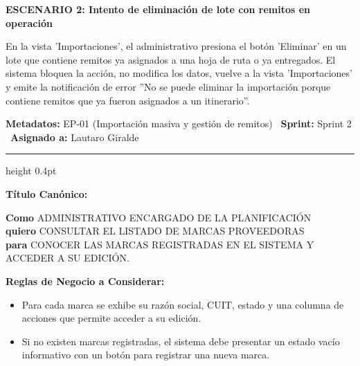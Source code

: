 \documentclass[a4paper,9pt]{article}
\begin{document}
\begin{tcolorbox}[hucard, title={\textbf{HU-40: ELIMINAR UNA IMPORTACIÓN} \hfill \scriptsize \colorbox{tealstatus}{\textbf{\ Accepted\ }} \quad \colorbox{white}{\textcolor{primarydark}{\textbf{\ 5 pts\ }}}}]
{\noindent\textbf{\textcolor{secondarydark}{ESCENARIO 2:  Intento de eliminación de lote con remitos en operación}}\par\vspace{1pt}
En la vista 'Importaciones', el administrativo presiona el botón 'Eliminar' en un lote que contiene remitos ya asignados a una hoja de ruta o ya entregados. El sistema bloquea la acción, no modifica los datos, vuelve a la vista 'Importaciones' y emite la notificación de error ''No se puede eliminar la importación porque contiene remitos que ya fueron asignados a un itinerario''.\par\vspace{2.5pt}
}\par
\end{tcolorbox}

\begin{tcolorbox}[hucard, title={\textbf{HU-239: LISTAR MARCAS} \hfill \scriptsize \colorbox{slatestatus}{\textbf{\ Done\ }} \quad \colorbox{white}{\textcolor{primarydark}{\textbf{\ 2 pts\ }}}}]
\vspace{-1pt}
\noindent\textbf{\footnotesize Metadatos:} EP-01 (Importación masiva y gestión de remitos) \textbar\ \textbf{Sprint:} Sprint 2 \textbar\ \textbf{Asignado a:} Lautaro Giralde\par\vspace{2pt}
\hrule height 0.4pt\par\vspace{3pt}
\noindent\textbf{\footnotesize Título Canónico:}\par\vspace{1pt}
{\small \textbf{Como} ADMINISTRATIVO ENCARGADO DE LA PLANIFICACIÓN \\ \textbf{quiero} CONSULTAR EL LISTADO DE MARCAS PROVEEDORAS \\ \textbf{para} CONOCER LAS MARCAS REGISTRADAS EN EL SISTEMA Y ACCEDER A SU EDICIÓN.}\par\vspace{3pt}
\noindent\textbf{\footnotesize Reglas de Negocio a Considerar:}\par\vspace{1pt}
{\footnotesize
\begin{itemize}[leftmargin=12pt, nosep, itemsep=1.5pt, topsep=1pt]
\item Para cada marca se exhibe su razón social, CUIT, estado y una columna de acciones que permite acceder a su edición.
\item Si no existen marcas registradas, el sistema debe presentar un estado vacío informativo con un botón para registrar una nueva marca.

\end{itemize}}
\end{tcolorbox}
\end{document}
